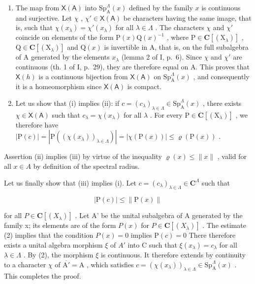 \begin{enumerate}
\def\labelenumi{\alph{enumi})}
\item
  The map from \(\mathsf{X}(\mathsf{A})\) into \(\mathrm{Sp}_{\mathrm{A}}^{\Lambda}(x)\) defined by the family \(x\) is continuous and surjective. Let \(\chi\) , \(\chi' \in \mathsf{X}(\mathsf{A})\) be characters having the same image, that is, such that \(\chi(x_{\lambda}) = \chi'(x_{\lambda})\) for all \(\lambda \in \Lambda\) . The characters \(\chi\) and \(\chi'\) coincide on elements of the form \(\mathrm{P}(x)\mathrm{Q}(x)^{-1}\) , where \(\mathrm{P} \in \mathbf{C}[(\mathrm{X}_{\lambda})]\) , \(\mathrm{Q} \in \mathbf{C}[(\mathrm{X}_{\lambda})]\) and \(\mathrm{Q}(x)\) is invertible in A, that is, on the full subalgebra of A generated by the elements \(x_{\lambda}\) (lemma 2 of I, p.~6). Since \(\chi\) and \(\chi'\) are continuous (th. 1 of I, p.~29), they are therefore equal on A. This proves that \(\mathsf{X}(h)\) is a continuous bijection from \(\mathsf{X}(\mathsf{A})\) on \(\mathrm{Sp}_{\mathrm{A}}^{\Lambda}(x)\) , and consequently it is a homeomorphism since \(\mathsf{X}(\mathsf{A})\) is compact.
\item
  Let us show that (i) implies (ii): if \(c = (c_{\lambda})_{\lambda \in \Lambda} \in \mathrm{Sp}_{\mathrm{A}}^{\Lambda}(x)\) , there exists \(\chi \in \mathsf{X}(\mathsf{A})\) such that \(c_{\lambda} = \chi(x_{\lambda})\) for all \(\lambda\) . For every \(\mathrm{P} \in \mathbf{C}[(\mathrm{X}_{\lambda})]\) , we therefore have \(|\mathrm{P}(c)| = |\mathrm{P}((\chi(x_{\lambda}))_{\lambda \in \Lambda})| = |\chi(\mathrm{P}(x))| \leqslant \varrho(\mathrm{P}(x))\) .
\end{enumerate}

Assertion (ii) implies (iii) by virtue of the inequality \(\varrho(x) \leqslant \|x\|\) , valid for all \(x \in A\) by definition of the spectral radius.

Let us finally show that (iii) implies (i). Let \(c = (c_{\lambda})_{\lambda \in \Lambda} \in \mathbf{C}^{\Lambda}\) such that

\[
| \mathrm{P} (c) | \leqslant \| \mathrm{P} (x) \|\tag{2}
\]

for all \(P \in \mathbf{C}[(X_{\lambda})]\) . Let A' be the unital subalgebra of A generated by the family x; its elements are of the form \(P(x)\) for \(P \in \mathbf{C}[(X_{\lambda})]\) . The estimate (2) implies that the condition \(P(x) = 0\) implies \(\mathrm{P}(c)=0\) There therefore exists a unital algebra morphism \(\xi\) of \(A'\) into C such that \(\xi(x_{\lambda})=c_{\lambda}\) for all \(\lambda\in\Lambda\) . By (2), the morphism \(\xi\) is continuous. It therefore extends by continuity to a character \(\chi\) of \(\overline{\mathrm{A}'}=\mathrm{A}\) , which satisfies \(c=(\chi(x_{\lambda}))_{\lambda\in\Lambda}\in\mathrm{Sp}_{\mathrm{A}}^{\Lambda}(x)\) . This completes the proof.

